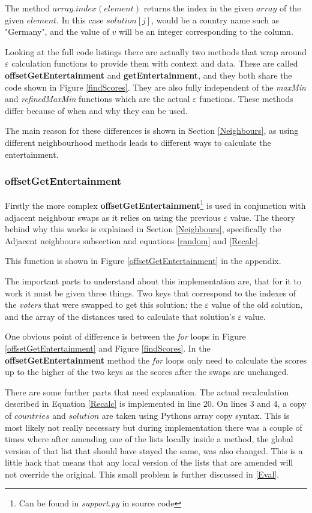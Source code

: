 \documentclass[12pt]{report}
\begin{document}
The method $array.index(element)$ returns the index in the given $array$ of the given $element$. In this case $solution[j]$, would be a country name such as "Germany", and the value of $v$ will be an integer corresponding to the column.

Looking at the full code listings there are actually two methods that wrap around $\varepsilon$ calculation functions to provide them with context and data. These are called \textbf{offsetGetEntertainment} and \textbf{getEntertainment}, and they both share the code shown in Figure \ref{findScores}. They are also fully independent of the \textit{maxMin} and \textit{refinedMaxMin} functions which are the actual $\varepsilon$ functions. These methods differ because of when and why they can be used.

The main reason for these differences is shown in Section \ref{Neighbours}, as using different neighbourhood methods leads to different ways to calculate the entertainment. 

\subsubsection{offsetGetEntertainment}
Firstly the more complex \textbf{offsetGetEntertainment}\footnote{Can be found in \textit{support.py} in source code} is used in conjunction with adjacent neighbour swaps as it relies on using the previous $\varepsilon$ value. The theory behind why this works is explained in Section \ref{Neighbours}, specifically the Adjacent neighbours subsection and equations \ref{random} and \ref{Recalc}.

This function is shown in Figure \ref{offsetGetEntertainment} in the appendix.

The important parts to understand about this implementation are, that for it to work it must be given three things. Two keys that correspond to the indexes of the \textit{voters} that were swapped to get this solution; the $\varepsilon$ value of the old solution, and the array of the distances used to calculate that solution's $\varepsilon$ value.

One obvious point of difference is between the \textit{for} loops in Figure \ref{offsetGetEntertainment} and Figure \ref{findScores}. In the \textbf{offsetGetEntertainment} method the \textit{for} loops only need to calculate the scores up to the higher of the two keys as the scores after the swaps are unchanged.

There are some further parts that need explanation. The actual recalculation described in Equation \ref{Recalc} is implemented in line 20. On lines 3 and 4, a copy of $countries$ and $solution$ are taken using Pythons array copy syntax. This is most likely not really necessary but during implementation there was a couple of times where after amending one of the lists locally inside a method, the global version of that list that should have stayed the same, was also changed. This is a little hack that means that any local version of the lists that are amended will not override the original. This small problem is further discussed in \ref{Eval}.
\end{document}
